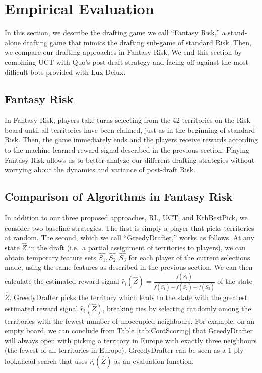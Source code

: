 \documentclass[letterpaper]{article}
\numberwithin{equation}{section}
\numberwithin{theorem}{section}
\numberwithin{lemma}{section}
\numberwithin{df}{section}
\begin{document}
\section{Empirical Evaluation}

In this section, we describe the drafting game we call ``Fantasy Risk,'' a stand-alone drafting game that mimics the drafting sub-game of standard Risk.  Then, we compare our drafting approaches in Fantasy Risk.  We end this section by combining UCT with Quo's post-draft strategy and facing off against the most difficult bots provided with Lux Delux.

\subsection{Fantasy Risk}

In Fantasy Risk, players take turns selecting from the 42 territories on the Risk board until all territories have been claimed, just as in the beginning of standard Risk.  Then, the game immediately ends and the players receive rewards according to the machine-learned reward signal described in the previous section.  Playing Fantasy Risk allows us to better analyze our different drafting strategies without worrying about the dynamics and variance of post-draft Risk.  

\subsection{Comparison of Algorithms in Fantasy Risk}

In addition to our three proposed approaches, RL, UCT, and KthBestPick, we consider two baseline strategies.  The first is simply a player that picks territories at random.  The second, which we call ``GreedyDrafter,'' works as follows.  At any state $\hat{Z}$ in the draft (i.e.~a partial assignment of territories to players), we can obtain temporary feature sets $\hat{S_1}, \hat{S_2}, \hat{S_3}$ for each player of the current selections made, using the same features as described in the previous section.  We can then calculate the estimated reward signal $\hat{r}_i(\hat{Z}) = \frac{f(\hat{S_1})}{f(\hat{S_1}) + f(\hat{S_2}) + f(\hat{S_3})}$ of the state $\hat{Z}$.  GreedyDrafter picks the territory which leads to the state with the greatest estimated reward signal $\hat{r}_i(\hat{Z})$, breaking ties by selecting randomly among the territories with the fewest number of unoccupied neighbours.  For example, on an empty board, we can conclude from Table \ref{tab:ContScoring} that GreedyDrafter will always open with picking a territory in Europe with exactly three neighbours (the fewest of all territories in Europe).  GreedyDrafter can be seen as a 1-ply lookahead search that uses $\hat{r}_i(\hat{Z})$ as an evaluation function.
\end{document}
